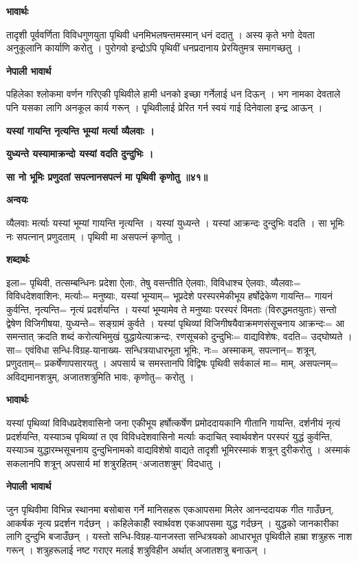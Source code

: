 \documentclass[11pt, a5paper]{article}
\begin{document}
\textbf{भावार्थः}

तादृशी पूर्ववर्णिता विविधगुणयुता पृथिवी धनमिभलषन्तमस्मान् धनं ददातु । अस्य कृते भगो देवता अनुकूलानि कार्याणि करोतु । पुरोगवो इन्द्रोऽपि पृथिवीं धनप्रदानाय प्रेरयितुमत्र समागच्छतु ।

\textbf{नेपाली भावार्थ}

पहिलेका श्लोकमा वर्णन गरिएकी पृथिवीले हामी धनको इच्छा गर्नेलाई धन दिऊन् । भग नामका देवताले पनि यसका लागि अनकूल कार्य गरून् । पृृथिवीलाई प्रेरित गर्न स्वयं गाई दिनेवाला इन्द्र आऊन् ।

\textbf{यस्यां गायन्ति नृत्यन्ति भूम्यां मर्त्या व्यैलवाः ।}

\textbf{युध्यन्ते यस्यामाक्रन्दो यस्यां वदति दुन्दुभिः ।}

\textbf{सा नो भूमिः प्रणुदतां सपत्नानसपत्नं मा पृथिवी कृणोतु ॥४१॥}

\textbf{अन्वयः}

व्यैलवाः मर्त्याः यस्यां भूम्यां गायन्ति नृत्यन्ति । यस्यां युध्यन्ते । यस्यां आक्रन्दः दुन्दुभिः वदति । सा भूमिः नः सपत्नान् प्रणुदताम् । पृथिवी मा असपत्नं कृणोतु ।

\textbf{शब्दार्थः}

इला= पृथिवी, तत्सम्बन्धिनः प्रदेशा ऐलाः, तेषु वसन्तीति ऐलवाः, विविधाश्च ऐलवाः, व्यैलवाः= विविधदेशवाशिनः, मर्त्याः= मनुष्याः, यस्यां भूम्याम्= भूप्रदेशे परस्परमेकीभूय हर्षोद्रेकेण गायन्ति= गायनं कुर्वन्ति, नृत्यन्ति= नृत्यं प्रदर्शयन्ति । यस्यां भूम्यामेव ते मनुष्याः परस्परं विमताः (विरुद्धमतयुताः) सन्तो द्वेषेण विजिगीषया, युध्यन्ते= सङ्‍ग्रामं कुर्वते । यस्यां पृथिव्यां विजिगीषयैवाक्रमणसंसूचनाय आक्रन्दः= आ समन्तात् क्रदति शब्दं करोत्यभिमुखं युद्धायेत्याक्रन्दः, रणसूचको दुन्दुभिः= वाद्यविशेषः, वदति= उद्घोष्यते । सा= एवंविधा सन्धि-विग्रह-यानाख्य- सन्धित्रयाधारभूता भूमिः, नः= अस्माकम्, सपत्नान्= शत्रून्, प्रणुदताम्= प्रकर्षेणापसारयतु । अपसार्य च समस्तानपि विद्विषः पृथिवी सर्वकालं मा= माम्, असपत्नम्= अविद्यमानशत्रुम्, अजातशत्रुमिति भावः, कृणोतु= करोतु ।

\textbf{भावार्थः}

यस्यां पृथिव्यां विविधप्रदेशवासिनो जना एकीभूय हर्षोत्कर्षेण प्रमोददायकानि गीतानि गायन्ति, दर्शनीयं नृत्यं प्रदर्शयन्ति, यस्याञ्च पृथिव्यां त एव विविधदेशवासिनो मर्त्याः कदाचित् स्वार्थवशेन परस्परं युद्धं कुर्वन्ति, यस्याञ्च युद्धारम्भसूचनाय दुन्दुभिनामको वाद्यविशेषो वाद्यते तादृशी भूमिरस्माकं शत्रून् दुरीकरोतु । अस्माकं सकलानपि शत्रून् अपसार्य मां शत्रुरहितम् ‘अजातशत्रुम्’ विदधातु ।

\textbf{नेपाली भावार्थ}

जुन पृथिवीमा विभिन्न स्थानमा बसोबास गर्ने मानिसहरू एकआपसमा मिलेर आनन्ददायक गीत गाउँछन्, आकर्षक नृत्य प्रदर्शन गर्दछन् । कहिलेकाहीँ स्वार्थवश एकआपसमा युद्ध गर्दछन् । युद्धको जानकारीका लागि दुन्दुभि बजाउँछन् । यस्तो सन्धि-विग्रह-यानजस्ता सन्धित्रयको आधारभूत पृथिवीले हाम्रा शत्रुहरू नाश गरून् । शत्रुहरूलाई नष्ट गराएर मलाई शत्रुविहीन अर्थात् अजातशत्रु बनाऊन् ।
\end{document}

